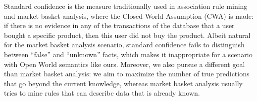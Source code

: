 Standard confidence is the measure traditionally used in association rule mining and market basket analysis, where the Closed World Assumption (CWA) is made:
if there is no evidence in any of the transactions of the database that a user bought a specific product, then this user did not buy the product.
Albeit natural for the market basket analysis scenario, standard confidence fails to distinguish between ``false'' and ``unknown'' facts,
which makes it inappropriate for a scenario with Open World semantics like ours. Moreover, we also pursue a different goal than market basket analysis:
we aim to maximize the number of true predictions that go beyond the current knowledge,
whereas market basket analysis usually tries to mine rules that can describe data that is already known.






